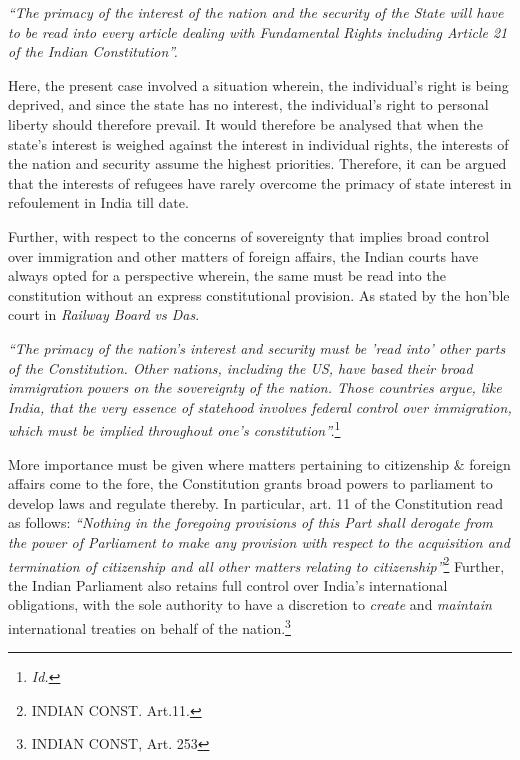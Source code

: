 \begin{multicols}{2}

\noi
\textit{“The primacy of the interest of the nation and the security of the State will have to be read
into every article dealing with Fundamental Rights including Article 21 of the Indian
Constitution”.}


\noi
Here, the present case involved a situation wherein, the individual's right is being deprived,
and since the state has no interest, the individual's right to personal liberty should therefore
prevail. It would therefore be analysed that when the state's interest is weighed against the
interest in individual rights, the interests of the nation and security assume the highest
priorities. Therefore, it can be argued that the interests of refugees have rarely overcome the
primacy of state interest in refoulement in India till date.

\vspace{-.15cm}

\noi
Further, with respect to the concerns of sovereignty that implies broad control over
immigration and other matters of foreign affairs, the Indian courts have always opted for a
perspective wherein, the same must be read into the constitution without an express
constitutional provision. As stated by the hon’ble court in \textit{Railway Board vs Das}.

\vspace{-.15cm}
\noi
\textit{“The primacy of the nation's interest and security must be 'read into' other parts of the
Constitution. Other nations, including the US, have based their broad immigration powers on
the sovereignty of the nation. Those countries argue, like India, that the very essence of statehood involves federal control over immigration, which must be implied throughout one's
constitution”.}\footnote{\textit{Id.}}

\vspace{-.15cm}

\noi
More importance must be given where matters pertaining to citizenship \& foreign affairs
come to the fore, the Constitution grants broad powers to parliament to develop laws and
regulate thereby. In particular, art. 11 of the Constitution read as follows: \textit{“Nothing in the
foregoing provisions of this Part shall derogate from the power of Parliament to make any
provision with respect to the acquisition and termination of citizenship and all other matters
relating to citizenship”}\footnote{INDIAN CONST. Art.11.} Further, the Indian Parliament also retains full control over India's
international obligations, with the sole authority to have a discretion to \textit{create} and \textit{maintain}
international treaties on behalf of the nation.\footnote{INDIAN CONST, Art. 253}


\end{multicols}
